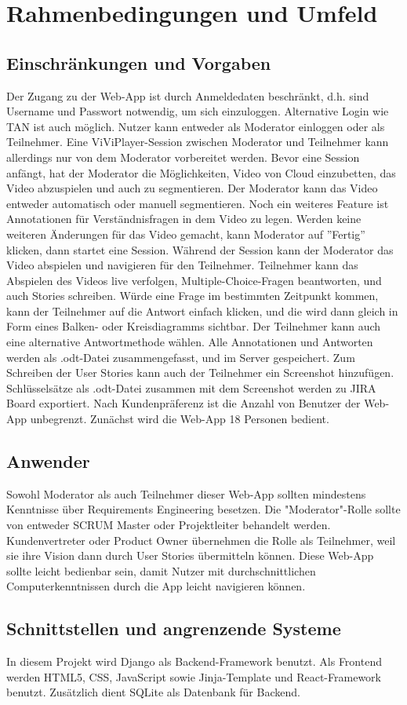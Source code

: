 \section{Rahmenbedingungen und Umfeld}

\subsection{Einschränkungen und Vorgaben}
Der Zugang zu der Web-App ist durch Anmeldedaten beschränkt, d.h. sind Username und Passwort notwendig, um sich einzuloggen. Alternative Login wie TAN ist auch möglich. Nutzer kann entweder als Moderator einloggen oder als Teilnehmer. Eine ViViPlayer-Session zwischen Moderator und Teilnehmer kann allerdings nur von dem Moderator vorbereitet werden.\linebreak
\linebreak
Bevor eine Session anfängt, hat der Moderator die Möglichkeiten, Video von Cloud einzubetten, das Video abzuspielen und auch zu segmentieren. Der Moderator kann das Video entweder automatisch oder manuell segmentieren. Noch ein weiteres Feature ist Annotationen für Verständnisfragen in dem Video zu legen. Werden keine weiteren Änderungen für das Video gemacht, kann Moderator auf ''Fertig'' klicken, dann startet eine Session.\linebreak
\linebreak
Während der Session kann der Moderator das Video abspielen und navigieren für den Teilnehmer. Teilnehmer kann das Abspielen des Videos live verfolgen, Multiple-Choice-Fragen beantworten, und auch Stories schreiben. Würde eine Frage im bestimmten Zeitpunkt kommen, kann der Teilnehmer auf die Antwort einfach klicken, und die wird dann gleich in Form eines Balken- oder Kreisdiagramms sichtbar. Der Teilnehmer kann auch eine alternative Antwortmethode wählen. Alle Annotationen und Antworten werden als .odt-Datei zusammengefasst, und im Server gespeichert. Zum Schreiben der User Stories kann auch der Teilnehmer ein Screenshot hinzufügen. Schlüsselsätze als .odt-Datei zusammen mit dem Screenshot werden zu JIRA Board exportiert.\linebreak
\linebreak
Nach Kundenpräferenz ist die Anzahl von Benutzer der Web-App unbegrenzt. Zunächst wird die Web-App 18 Personen bedient.

\subsection{Anwender}
Sowohl Moderator als auch Teilnehmer dieser Web-App sollten mindestens Kenntnisse über Requirements Engineering besetzen. Die "Moderator"-Rolle sollte von entweder SCRUM Master oder Projektleiter behandelt werden. Kundenvertreter oder Product Owner übernehmen die Rolle als Teilnehmer, weil sie ihre Vision dann durch User Stories übermitteln können. Diese Web-App sollte leicht bedienbar sein, damit Nutzer mit durchschnittlichen Computerkenntnissen durch die App leicht navigieren können.

\subsection{Schnittstellen und angrenzende Systeme} 
In diesem Projekt wird Django als Backend-Framework benutzt. Als Frontend werden HTML5, CSS, JavaScript sowie Jinja-Template und React-Framework benutzt. Zusätzlich dient SQLite als Datenbank für Backend.
